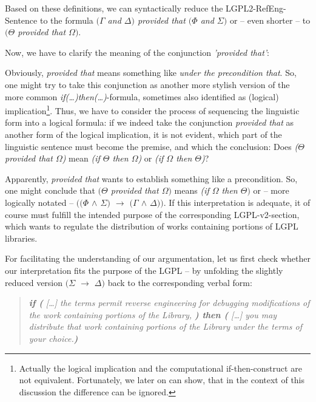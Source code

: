 Based on these definitions, we can syntactically reduce the
LGPL2-RefEng-Sentence to the formula \emph{$(\Gamma$ and $\Delta)$ provided that
$(\Phi$ and $\Sigma)$} or -- even shorter -- to \emph{$(\Theta$ provided that
$\Omega)$}.

Now, we have to clarify the meaning of the conjunction \emph{'provided that'}:

Obviously, \emph{provided that} means something like \emph{under the
precondition that}. So, one might try to take this conjunction as another more
stylish version of the more common \emph{if(\ldots)then(\ldots)}-formula,
sometimes also identified as (logical) implication\footnote{Actually the logical
implication and the computational if-then-construct are not equivalent.
Fortunately, we later on can show, that in the context of this discussion the
difference can be ignored.}. Thus, we have to consider the process of sequencing
the linguistic form into a logical formula: if we indeed take the conjunction
\emph{provided that} as another form of the logical implication, it is not
evident, which part of the linguistic sentence must become the premise, and
which the conclusion: Does \emph{($\Theta$ provided that $\Omega$)} mean
\emph{(if $\Theta$ then $\Omega$)} or \emph{(if $\Omega$ then $\Theta$)}?

Apparently, \emph{provided that} wants to establish something like a
precondition. So, one might conclude that \emph{$(\Theta$ provided that
$\Omega)$} means \emph{(if $\Omega$ then $\Theta)$} or -- more logically notated
-- \emph{$((\Phi$ $\wedge$ $\Sigma)$ $\rightarrow$ $(\Gamma$ $\wedge$
$\Delta))$}. If this interpretation is adequate, it of course must fulfill the
intended purpose of the corresponding LGPL-v2-section, which wants to regulate
the distribution of works containing portions of LGPL libraries.

For facilitating the understanding of our argumentation, let us first check
whether our interpretation fits the purpose of the LGPL -- by unfolding the
slightly reduced version \emph{$(\Sigma$ $\rightarrow$ $\Delta)$} back to the
corresponding verbal form:

\begin{quote}\noindent\emph{\textbf{if (} [\ldots] the terms permit reverse
engineering for debugging modifications of the work containing portions of the
Library, \textbf{) then (} [\ldots] you may distribute that work containing
portions of the Library under the terms of your choice.\textbf{)}}\end{quote}

